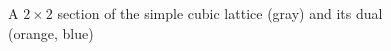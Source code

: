 \begin{figure}[!h]
\begin{tikzpicture}
        
        
    \end{tikzpicture}
    \caption{A $2 \times 2$ section of the simple cubic lattice (gray) and its dual (orange, blue)}
    \label{fig:z3_dual}
\end{figure}